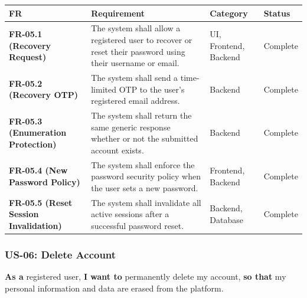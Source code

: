\documentclass[12pt]{article}
\renewcommand{\baselinestretch}{1.5}
\begin{document}
\begingroup
\small
\renewcommand{\baselinestretch}{1.0}\selectfont
\renewcommand{\arraystretch}{1.15}
\setlength{\tabcolsep}{6pt}
\begin{longtable}{|>{\raggedright\arraybackslash}p{}|>{\raggedright\arraybackslash}p{}|>{\raggedright\arraybackslash}p{}|>{\raggedright\arraybackslash}p{}|}
\hline
\textbf{FR} & \textbf{Requirement} & \textbf{Category} & \textbf{Status} \\ \hline
\endhead
\textbf{FR-05.1 (Recovery Request)} & The system shall allow a registered user to recover or reset their password using their username or email. & UI, Frontend, Backend & Complete \\ \hline
\textbf{FR-05.2 (Recovery OTP)} & The system shall send a time-limited OTP to the user's registered email address. & Backend & Complete \\ \hline
\textbf{FR-05.3 (Enumeration Protection)} & The system shall return the same generic response whether or not the submitted account exists. & Backend & Complete \\ \hline
\textbf{FR-05.4 (New Password Policy)} & The system shall enforce the password security policy when the user sets a new password. & Frontend, Backend & Complete \\ \hline
\textbf{FR-05.5 (Reset Session Invalidation)} & The system shall invalidate all active sessions after a successful password reset. & Backend, Database & Complete \\ \hline
\end{longtable}
\endgroup
\par\medskip

\hypertarget{sec:us-06-delete-account}{}
\subsubsection*{US-06: Delete Account}
\par\medskip

\textbf{As a} registered user, \textbf{I want to} permanently delete my account, \textbf{so that} my personal information and data are erased from the platform.
\par\medskip
\end{document}
